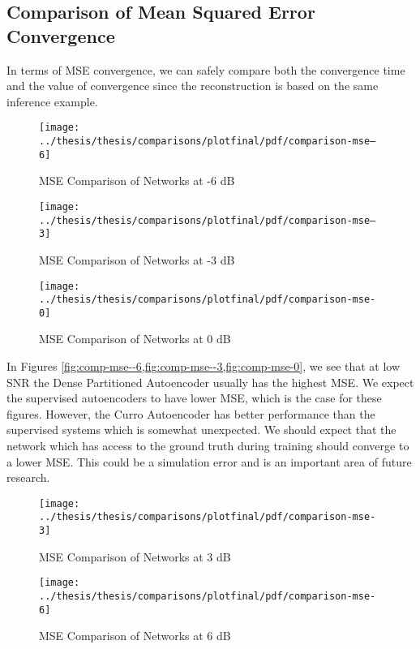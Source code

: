 \subsection{Comparison of Mean Squared Error Convergence}

In terms of MSE convergence, we can safely compare both the convergence time and the value of convergence since the reconstruction is based on the same inference example.

\begin{figure}[!ht]
\centering
\texttt{[image: ../thesis/thesis/comparisons/plotfinal/pdf/comparison-mse--6]}
\caption{MSE Comparison of Networks at -6 dB}\label{fig:comp-mse--6}
\end{figure}

\begin{figure}[!ht]
\centering
\texttt{[image: ../thesis/thesis/comparisons/plotfinal/pdf/comparison-mse--3]}
\caption{MSE Comparison of Networks at -3 dB}\label{fig:comp-mse--3}
\end{figure}

\begin{figure}[!ht]
\centering
\texttt{[image: ../thesis/thesis/comparisons/plotfinal/pdf/comparison-mse-0]}
\caption{MSE Comparison of Networks at 0 dB}\label{fig:comp-mse-0}
\end{figure}

In Figures \cref{fig:comp-mse--6,fig:comp-mse--3,fig:comp-mse-0}, we see that at low SNR the Dense Partitioned Autoencoder usually has the highest MSE. We expect the supervised autoencoders to have lower MSE, which is the case for these figures. However, the Curro Autoencoder has better performance than the supervised systems which is somewhat unexpected. We should expect that the network which has access to the ground truth during training should converge to a lower MSE. This could be a simulation error and is an important area of future research.

\begin{figure}[!ht]
\centering
\texttt{[image: ../thesis/thesis/comparisons/plotfinal/pdf/comparison-mse-3]}
\caption{MSE Comparison of Networks at 3 dB}\label{fig:comp-mse-3}
\end{figure}

\begin{figure}[!ht]
\centering
\texttt{[image: ../thesis/thesis/comparisons/plotfinal/pdf/comparison-mse-6]}
\caption{MSE Comparison of Networks at 6 dB}\label{fig:comp-mse-6}
\end{figure}

